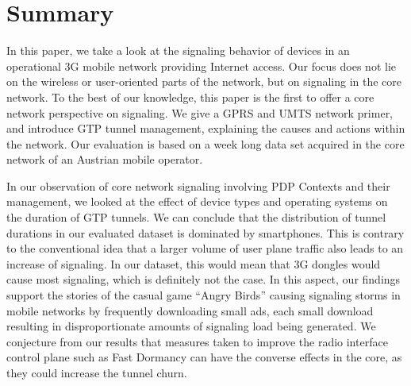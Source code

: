 











\section{Summary}
\label{c4:sec:conclusion}
In this paper, we take a look at the signaling behavior of devices in an operational \gls{3G} mobile network providing Internet access. Our focus does not lie on the wireless or user-oriented parts of the network, but on signaling in the core network. To the best of our knowledge, this paper is the first to offer a core network perspective on signaling. We give a \gls{GPRS} and \gls{UMTS} network primer, and introduce \gls{GTP} tunnel management, explaining the causes and actions within the network. Our evaluation is based on a week long data set acquired in the core network of an Austrian mobile operator.

In our observation of core network signaling involving PDP Contexts and their management, we looked at the effect of device types and operating systems on the duration of GTP tunnels. We can conclude that the distribution of tunnel durations in our evaluated dataset is dominated by smartphones. This is contrary to the conventional idea that a larger volume of user plane traffic also leads to an increase of signaling. In our dataset, this would mean that 3G dongles would cause most signaling, which is definitely not the case. In this aspect, our findings support the stories of the casual game ``Angry Birds'' causing signaling storms in mobile networks by frequently downloading small ads, each small download resulting in disproportionate amounts of signaling load being generated. We conjecture from our results that measures taken to improve the radio interface control plane such as Fast Dormancy can have the converse effects in the core, as they could increase the tunnel churn.

